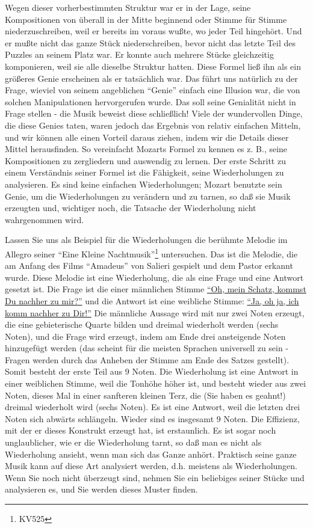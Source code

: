 Wegen dieser vorherbestimmten Struktur war er in der Lage, seine Kompositionen von überall in der Mitte beginnend oder Stimme für Stimme niederzuschreiben, weil er bereits im voraus wußte, wo jeder Teil hingehört.
Und er mußte nicht das ganze Stück niederschreiben, bevor nicht das letzte Teil des Puzzles an seinem Platz war.
Er konnte auch mehrere Stücke gleichzeitig komponieren, weil sie alle dieselbe Struktur hatten.
Diese Formel ließ ihn als ein größeres Genie erscheinen als er tatsächlich war.
Das führt uns natürlich zu der Frage, wieviel von seinem angeblichen \enquote{Genie} einfach eine Illusion war, die von solchen Manipulationen hervorgerufen wurde.
Das soll seine Genialität nicht in Frage stellen - die Musik beweist diese schließlich!
Viele der wundervollen Dinge, die diese Genies taten, waren jedoch das Ergebnis von relativ einfachen Mitteln, und wir können alle einen Vorteil daraus ziehen, indem wir die Details dieser Mittel herausfinden.
So vereinfacht Mozarts Formel zu kennen es z. B., seine Kompositionen zu zergliedern und auswendig zu lernen.
Der erste Schritt zu einem Verständnis seiner Formel ist die Fähigkeit, seine Wiederholungen zu analysieren.
Es sind keine einfachen Wiederholungen; Mozart benutzte sein Genie, um die Wiederholungen zu verändern und zu tarnen, so daß sie Musik erzeugten und, wichtiger noch, die Tatsache der Wiederholung nicht wahrgenommen wird.


\hypertarget{KV525}{}

Lassen Sie uns als Beispiel für die Wiederholungen die berühmte Melodie im Allegro seiner \enquote{Eine Kleine Nachtmusik}\footnote{KV525} untersuchen.
Das ist die Melodie, die am Anfang des Films \enquote{Amadeus} von Salieri gespielt und dem Pastor erkannt wurde.
Diese Melodie ist eine Wiederholung, die als eine Frage und eine Antwort gesetzt ist.
Die Frage ist die einer männlichen Stimme \hyperlink{ueb-KV525}{\enquote{Oh, mein Schatz, kommst Du nachher zu mir?}} und die Antwort ist eine weibliche Stimme: \hyperlink{ueb-KV525}{\enquote{Ja, oh ja, ich komm nachher zu Dir!}}
Die männliche Aussage wird mit nur zwei Noten erzeugt, die eine gebieterische Quarte bilden und dreimal wiederholt werden (sechs Noten), und die Frage wird erzeugt, indem am Ende drei ansteigende Noten hinzugefügt werden (das scheint für die meisten Sprachen universell zu sein - Fragen werden durch das Anheben der Stimme am Ende des Satzes gestellt).
Somit besteht der erste Teil aus 9 Noten.
Die Wiederholung ist eine Antwort in einer weiblichen Stimme, weil die Tonhöhe höher ist, und besteht wieder aus zwei Noten, dieses Mal in einer sanfteren kleinen Terz, die (Sie haben es geahnt!) dreimal wiederholt wird (sechs Noten).
Es ist eine Antwort, weil die letzten drei Noten sich abwärts schlängeln.
Wieder sind es insgesamt 9 Noten.
Die Effizienz, mit der er dieses Konstrukt erzeugt hat, ist erstaunlich.
Es ist sogar noch unglaublicher, wie er die Wiederholung tarnt, so daß man es nicht als Wiederholung ansieht, wenn man sich das Ganze anhört.
Praktisch seine ganze Musik kann auf diese Art analysiert werden, d.h. meistens als Wiederholungen.
Wenn Sie noch nicht überzeugt sind, nehmen Sie ein beliebiges seiner Stücke und analysieren es, und Sie werden dieses Muster finden.

